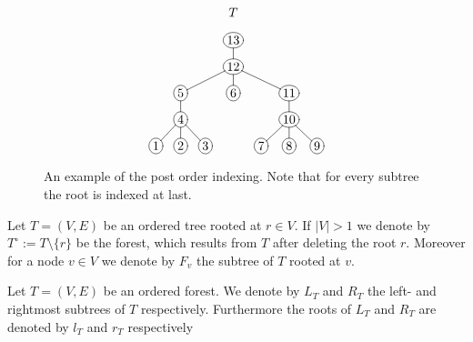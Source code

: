 \begin{figure}[!ht]
	\begin{displaymath}
	\xymatrix @R=3mm @C=3mm{
		&&&T&&&\\
		&&&*+[o][F-]{13}\ar@{-}[d] &&&\\
		&&&*+[o][F-]{12}\ar@{-}[d] \ar@{-}[dll] \ar@{-}[drr]&&\\
		&*+[o][F-]{5} \ar@{-}[d]&&*+[o][F-]{6}&&*+[o][F-]{11} \ar@{-}[d]\\
		&*+[o][F-]{4} \ar@{-}[dl] \ar@{-}[d] \ar@{-}[dr]&&&&*+[o][F-]{10} \ar@{-}[dl] \ar@{-}[d] \ar@{-}[dr]\\
		*+[o][F-]{1}&*+[o][F-]{2}&*+[o][F-]{3}&&*+[o][F-]{7}&*+[o][F-]{8}&*+[o][F-]{9}	
	}
	\end{displaymath}
	\caption{An example of the post order indexing. Note that for every subtree the root is indexed at last.}
	\label{fig:postorder}
\end{figure} 
\begin{defin} Let $T=(V,E)$ be an ordered tree rooted at $r \in V$. If $|V| > 1$ we denote by $T^{\circ} := T \setminus \{r\}$ be the forest, which results from $T$ after deleting the root $r$. Moreover for a node $v\in V$ we denote by $F_v$ the subtree of $T$ rooted at $v$. 
\end{defin}
\begin{defin} Let $T=(V,E)$ be an ordered forest. We denote by $L_T$ and $R_T$ the left- and rightmost subtrees of $T$ respectively. Furthermore the roots of $L_T$ and $R_T$ are denoted by $l_T$ and $r_T$ respectively
\end{defin}
